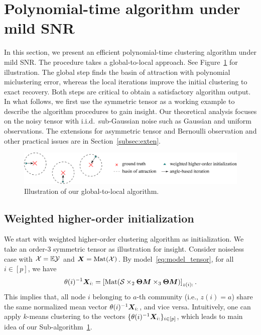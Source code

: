 \documentclass[lettersize,onecolumn,journal]{IEEEtran}
\theoremstyle{definition}
\theoremstyle{definition}
\newcommand{\off}[1]{\left[#1\right]}
\begin{document}
\section{Polynomial-time algorithm under mild SNR}\label{sec:alg}
In this section, we present an efficient polynomial-time clustering algorithm under mild SNR. The procedure takes a global-to-local approach. See Figure~\ref{fig:demo} for illustration. The global step finds the basin of attraction with polynomial miclustering error, whereas the local iterations improve the initial clustering to exact recovery. Both steps are critical to obtain a satisfactory algorithm output. In what follows, we first use the symmetric tensor as a working example to describe the algorithm procedures to gain insight. Our theoretical analysis focuses on the noisy tensor with i.i.d.\ sub-Gaussian noise such as Gaussian and uniform observations. The extensions for asymmetric tensor and Bernoulli observation and other practical issues are in Section~\ref{subsec:exten}.

\begin{figure}[ht!]
\centering
\includegraphics[width=\columnwidth]{alg_demo1.pdf}
\caption{Illustration of our global-to-local algorithm.}\label{fig:demo}
\end{figure}

\subsection{Weighted higher-order initialization}

We start with weighted higher-order clustering algorithm as initialization. We take an order-3 symmetric tensor as illustration for insight. Consider noiseless case with $\mathcal{X} = \mathbb{E}\mathcal{Y}$ and $\bm X = \text{Mat}(\mathcal{X})$. 
By model~\eqref{eq:model_tensor}, for all $i \in [p]$, we have
\begin{equation}\label{eq:kmeans}
    \theta(i)^{-1} \mX_{i:} = \off{\text{Mat}( \tS \times_2 \mTheta \mM \times_3  \mTheta \mM )}_{z(i):}. 
\end{equation}
This implies that, all node $i$ belonging to $a$-th community (i.e., $z(i)=a$) share the same normalized mean vector $\theta(i)^{-1} \bm X_{i:}$, and vice versa. Intuitively, one can apply $k$-means clustering to the vectors $\{ \theta(i)^{-1} \bm X_{i:} \}_{i\in[p]}$, which leads to main idea of our Sub-algorithm~\hyperref[alg:main]{1}.  
\end{document}
